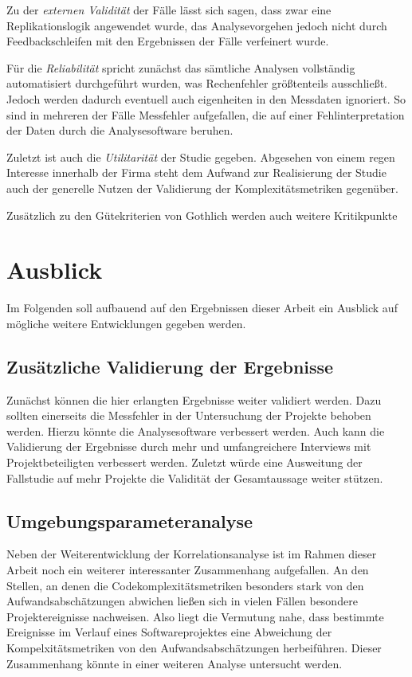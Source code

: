 Zu der \emph{externen Validität} der Fälle lässt sich sagen, dass zwar
eine Replikationslogik angewendet wurde, das Analysevorgehen jedoch
nicht durch Feedbackschleifen mit den Ergebnissen der Fälle verfeinert
wurde.

Für die \emph{Reliabilität} spricht zunächst das sämtliche Analysen
vollständig automatisiert durchgeführt wurden, was Rechenfehler
größtenteils ausschließt. Jedoch werden dadurch eventuell auch
eigenheiten in den Messdaten ignoriert. So sind in mehreren der Fälle
Messfehler aufgefallen, die auf einer Fehlinterpretation der Daten durch
die Analysesoftware beruhen.

Zuletzt ist auch die \emph{Utilitarität} der Studie gegeben. Abgesehen
von einem regen Interesse innerhalb der Firma steht dem Aufwand zur
Realisierung der Studie auch der generelle Nutzen der Validierung der
Komplexitätsmetriken gegenüber.

Zusätzlich zu den Gütekriterien von Gothlich werden auch weitere
Kritikpunkte

\section{Ausblick}\label{Ausblick}

Im Folgenden soll aufbauend auf den Ergebnissen dieser Arbeit ein
Ausblick auf mögliche weitere Entwicklungen gegeben werden.

\subsection{Zusätzliche Validierung der Ergebnisse}\label{Zusatzliche-Validierung-der-Ergebnisse}

Zunächst können die hier erlangten Ergebnisse weiter validiert werden.
Dazu sollten einerseits die Messfehler in der Untersuchung der Projekte
behoben werden. Hierzu könnte die Analysesoftware verbessert werden.
Auch kann die Validierung der Ergebnisse durch mehr und umfangreichere
Interviews mit Projektbeteiligten verbessert werden. Zuletzt würde eine
Ausweitung der Fallstudie auf mehr Projekte die Validität der
Gesamtaussage weiter stützen.

\subsection{Umgebungsparameteranalyse}\label{Umgebungsparameteranalyse}

Neben der Weiterentwicklung der Korrelationsanalyse ist im Rahmen dieser
Arbeit noch ein weiterer interessanter Zusammenhang aufgefallen. An den
Stellen, an denen die Codekomplexitätsmetriken besonders stark von den
Aufwandsabschätzungen abwichen ließen sich in vielen Fällen besondere
Projektereignisse nachweisen. Also liegt die Vermutung nahe, dass
bestimmte Ereignisse im Verlauf eines Softwareprojektes eine Abweichung
der Kompelxitätsmetriken von den Aufwandsabschätzungen herbeiführen.
Dieser Zusammenhang könnte in einer weiteren Analyse untersucht werden.

